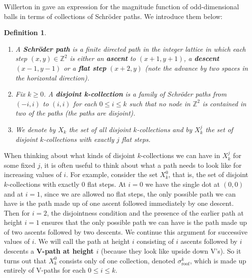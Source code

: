 \documentclass[11pt]{article}
\newcommand{\Z}{\mathbb{Z}}
\theoremstyle{mythm}
\newtheorem{defn}{Definition}[section]
\begin{document}
Willerton in \cite{willerton_magnitude_2017} gave an expression for the magnitude function of odd-dimensional balls in terms of collections of Schröder paths. We introduce them below:
\begin{defn}
\begin{enumerate}[label=$\bullet$]
\item A \textbf{Schröder path} is a finite directed path in the integer lattice in which each step $(x,y)\in\Z^2$ is either an \textbf{ascent} to $(x+1,y+1)$, a \textbf{descent} $(x-1,y-1)$ or a \textbf{flat step} $(x+2,y)$ (note the advance by \emph{two} spaces in the horizontal direction).
\item Fix $k\geq0$. A \textbf{disjoint k-collection} is a family of Schröder paths from $(-i,i)$ to $(i,i)$ for each $0\leq i\leq k$ such that no node in $\Z^2$ is contained in two of the paths (the paths are disjoint).
\item We denote by $X_k$ the set of all disjoint $k$-collections and by $X_k^j$ the set of disjoint $k$-collections with exactly $j$ flat steps.
\end{enumerate}
\end{defn}

When thinking about what kinds of disjoint $k$-collections we can have in $X_k^j$ for some fixed $j$, it is often useful to think about what a path needs to look like for increasing values of $i$. For example, consider the set $X_k^0$, that is, the set of disjoint $k$-collections with exactly 0 flat steps. At $i = 0$ we have the single dot at $(0,0)$ and at $i = 1$, since we are allowed no flat steps, the only possible path we can have is the path made up of one ascent followed immediately by one descent. Then for $i = 2$, the disjointness condition and the presence of the earlier path at height $i=1$ ensures that the only possible path we can have is the path made up of two ascents followed by two descents. We continue this argument for successive values of $i$. We will call the path at height $i$ consisting of $i$ ascents followed by $i$ descents a \textbf{V-path at height $i$} (because they look like upside down V's). So it turns out that $X_k^0$ consists only of one collection, denoted $\sigma_{\text{roof}}^k$, which is made up entirely of V-paths for each $0\leq i\leq k$.
\end{document}
